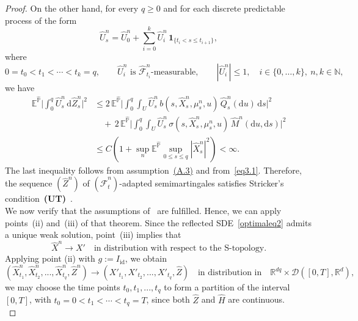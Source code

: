 \documentclass[11pt,amsfonts]{article}
\theoremstyle{plain}
\theoremstyle{assumpstyle}
\numberwithin{equation}{section}
\numberwithin{theorem}{section}
\numberwithin{proposition}{section}
\numberwithin{definition}{section}
\numberwithin{remark}{section}
\numberwithin{corollary}{section}
\numberwithin{lemma}{section}
\begin{document}
\begin{proof}
On the other hand, for every $q \ge 0$ and for each discrete predictable process 
of the form
\begin{equation*}
\hat{U}^{n}_{s}
=
\hat{U}^{n}_{0}
+
\sum_{i=0}^{k}
\hat{U}^{n}_{i}\,
\mathbf{1}_{\{t_i < s \le t_{i+1}\}},
\end{equation*}
where 
\begin{equation*}
0 = t_0 < t_1 < \cdots < t_k = q, 
\qquad
\hat{U}^{n}_{i} \text{ is } \hat{\mathcal{F}}^{n}_{t_i}\text{-measurable},
\qquad
|\hat{U}^{n}_{i}| \le 1,
\quad i \in \{0,\dots,k\},\ n,k \in \mathbb{N},
\end{equation*}
we have
\begin{align*}
\mathbb{E}^{\hat{\mathbb{P}}} 
\Big| \int_{0}^{q} \hat{U}^n_{s} \, \mathrm{d} \hat{Z}^n_s \Big|^2 
&\leq 
2\,\mathbb{E}^{\hat{\mathbb{P}}} 
\Bigg|
\int_{0}^{q}\int_{U} 
\hat{U}^n_s\, 
b(s, \hat{X}^n_s, \mu^n_s, u)\, 
\hat{Q}^n_s(\mathrm{d}u)\,\mathrm{d}s 
\Bigg|^2
\\
&\quad +\, 
2\,\mathbb{E}^{\hat{\mathbb{P}}}
\Bigg|
\int_{0}^{q}\int_{U} 
\hat{U}^n_s\, 
\sigma(s, \hat{X}^n_s, \mu^n_s, u)\, 
\hat{M}^n(\mathrm{d}u, \mathrm{d}s)
\Bigg|^2
\\[4pt]
&\le 
C\left( 1 + 
\sup_{n} 
\mathbb{E}^{\hat{\mathbb{P}}}
\sup_{0 \le s \le q} 
|\hat{X}^n_s|^2 
\right)
< \infty.
\end{align*}
The last inequality follows from assumption~\hyperlink{A.3}{(A.3)} and from~\eqref{eq3.1}. 
Therefore, the sequence $(\hat{Z}^n)$ of 
$(\hat{\mathcal{F}}^{n}_{t})$-adapted semimartingales 
satisfies Stricker’s condition~\textbf{(UT)}~\cite{stricker}.\\
We now verify that the assumptions of~\cite[Theorem~4.3]{Lauka} are fulfilled. 
Hence, we can apply points~(ii) and~(iii) of that theorem. 
Since the reflected SDE~\eqref{optimaleq2} admits a unique weak solution, 
point~(iii) implies that
\begin{equation*}
\hat{X}^n \to X'
\quad \text{in distribution with respect to the S-topology.}
\end{equation*}
Applying point (ii) with $ g := I_{\text{id}}$, we obtain
\begin{equation*}
(\hat{X}^n_{t_1}, \hat{X}^n_{t_2}, ..., \hat{X}^n_{t_q}, \hat{Z}^n) \to  (X'_{t_1}, X'_{t_2}, ..., X'_{t_q}, \hat{Z}) \quad \text{in distribution in} \quad \mathbb{R}^{dq} \times \mathcal{D}([0, T], \mathbb{R}^d),
\end{equation*}
we may choose the time points $ t_0, t_1, ..., t_q$ to form a partition of the interval $[0, T]$, with $ t_0 = 0 < t_1 < \cdots < t_q = T$, since both $ \hat{Z} $ and $\hat{H}$ are continuous.\\

\end{proof}
\end{document}
